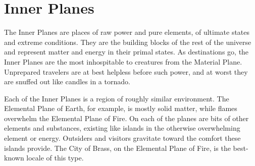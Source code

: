 \section{Inner Planes}
The Inner Planes are places of raw power and pure elements, of ultimate states and extreme conditions. They are the building blocks of the rest of the universe and represent matter and energy in their primal states. As destinations go, the Inner Planes are the most inhospitable to creatures from the Material Plane. Unprepared travelers are at best helpless before such power, and at worst they are snuffed out like candles in a tornado.

Each of the Inner Planes is a region of roughly similar environment. The Elemental Plane of Earth, for example, is mostly solid matter, while flames overwhelm the Elemental Plane of Fire. On each of the planes are bits of other elements and substances, existing like islands in the otherwise overwhelming element or energy. Outsiders and visitors gravitate toward the comfort these islands provide. The City of Brass, on the Elemental Plane of Fire, is the best-known locale of this type.











